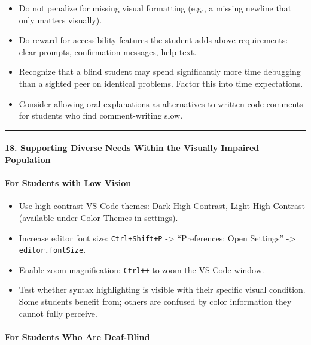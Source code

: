 \documentclass[
  justified,
  openright,
]{tufte-book}
\let\subsection\paragraph
\let\paragraph\paragraph
\let\subsection\paragraph
\let\paragraph\paragraph
\providecommand{\tightlist}{%
  \setlength{\itemsep}{0pt}\setlength{\parskip}{0pt}}
\begin{document}
\begin{itemize}
\tightlist
\item
  Do not penalize for missing visual formatting (e.g., a missing newline
  that only matters visually).
\item
  Do reward for accessibility features the student adds above
  requirements: clear prompts, confirmation messages, help text.
\item
  Recognize that a blind student may spend significantly more time
  debugging than a sighted peer on identical problems. Factor this into
  time expectations.
\item
  Consider allowing oral explanations as alternatives to written code
  comments for students who find comment-writing slow.
\end{itemize}

\begin{center}\rule{0.5\linewidth}{0.5pt}\end{center}

\subsection{18. Supporting Diverse Needs Within the Visually Impaired
Population}\label{supporting-diverse-needs-within-the-visually-impaired-population}

\subsection{For Students with Low
Vision}\label{for-students-with-low-vision}

\begin{itemize}
\tightlist
\item
  Use high-contrast VS Code themes: Dark High Contrast, Light High
  Contrast (available under Color Themes in settings).
\item
  Increase editor font size: \texttt{Ctrl+Shift+P} -\textgreater{}
  ``Preferences: Open Settings'' -\textgreater{}
  \texttt{editor.fontSize}.
\item
  Enable zoom magnification: \texttt{Ctrl++} to zoom the VS Code window.
\item
  Test whether syntax highlighting is visible with their specific visual
  condition. Some students benefit from; others are confused by color
  information they cannot fully perceive.
\end{itemize}

\subsection{For Students Who Are
Deaf-Blind}\label{for-students-who-are-deaf-blind}
\end{document}
